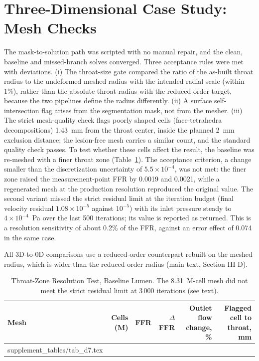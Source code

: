 \documentclass[journal,twoside,web,onecolumn]{ieeecolor}
\begin{document}
\FloatBarrier
\section{Three-Dimensional Case Study: Mesh Checks}\label{sec:cfd}
The mask-to-solution path was scripted with no manual repair, and the clean, baseline and missed-branch solves
converged. Three acceptance rules were met with deviations. (i) The throat-size gate compared the ratio of the
as-built throat radius to the undeformed meshed radius with the intended radial scale (within 1\%), rather than the
absolute throat radius with the reduced-order target, because the two pipelines define the radius differently. (ii) A surface self-intersection flag arises from the segmentation mask, not from the mesher. (iii) The
strict mesh-quality check flags poorly shaped cells (face-tetrahedra decompositions) 1.43~mm from the throat center,
inside the planned 2~mm exclusion distance; the lesion-free mesh carries a similar count, and the standard quality
check passes. To test whether these cells affect the result, the baseline was re-meshed with a finer throat zone
(Table~\ref{tab:d7}). The acceptance criterion, a change smaller than the discretization uncertainty of
$5.5\times10^{-4}$, was not met: the finer zone raised the measurement-point FFR by 0.0019 and 0.0021, while a
regenerated mesh at the production resolution reproduced the original value. The second variant missed the strict
residual limit at the iteration budget (final velocity residual $1.08\times10^{-5}$ against $10^{-5}$) with its inlet
pressure steady to $4\times10^{-4}$~Pa over the last 500 iterations; its value is reported as returned. This is a resolution sensitivity of
about 0.2\% of the FFR, against an error effect of 0.074 in the same case.

All 3D-to-0D comparisons use a reduced-order counterpart rebuilt on the meshed radius, which is wider than the
reduced-order radius (main text, Section III-D).
\begin{table}[!ht]
\caption{Throat-Zone Resolution Test, Baseline Lumen. The 8.31~M-cell mesh did not meet the strict residual limit at
3\,000 iterations (see text).}\label{tab:d7}
\centering\small
\begin{tabular}{@{}lrrrrr@{}}
\toprule
Mesh & Cells (M) & FFR & $\Delta$FFR & Outlet flow change, \% & Flagged cell to throat, mm\\
\midrule
{} supplement_tables/tab_d7.tex 
\bottomrule
\end{tabular}
\end{table}
\end{document}
